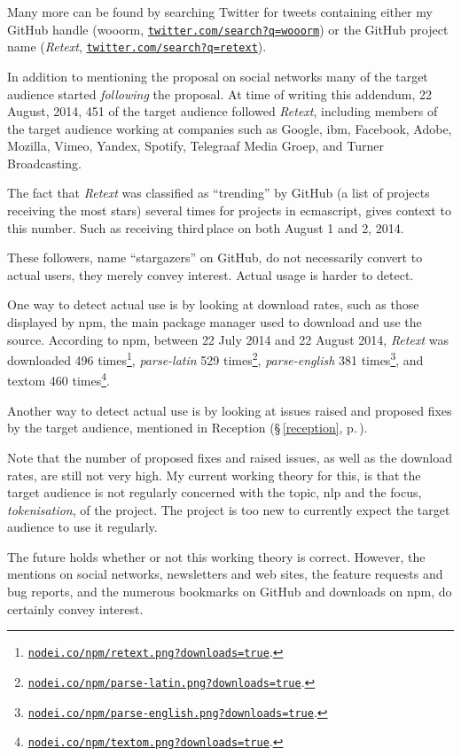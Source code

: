 \noindent Many more can be found by searching Twitter for tweets containing
  either my GitHub handle (wooorm,
  \href{https://twitter.com/search?f=realtime&q=wooorm}{\nolinkurl{twitter.com/search?q=wooorm}})
  or the GitHub project name (\emph{Retext},
  \href{https://twitter.com/search?f=realtime&q=retext}{\nolinkurl{twitter.com/search?q=retext}}).

In addition to mentioning the proposal on social networks many of the target
  audience started \emph{following} the proposal.
At time of writing this addendum, 22 August, 2014, 451 of the target
  audience followed \emph{Retext}, including members of the target audience
  working at companies such as Google, \gls{ibm}, Facebook, Adobe, Mozilla,
  Vimeo, Yandex, Spotify, Telegraaf Media Groep, and Turner Broadcasting.

The fact that \emph{Retext} was classified as ``trending'' by GitHub (a list
  of projects receiving the most stars) several times for projects in
  \gls{ecmascript}, gives context to this number.
Such as receiving third\,place on both August 1 and 2, 2014.

These followers, name ``stargazers'' on GitHub, do not necessarily convert to
  actual users, they merely convey interest.
Actual usage is harder to detect.

One way to detect actual use is by looking at download rates, such as
  those displayed by \gls{npm}, the main package manager used to download
  and use the source.
According to \gls{npm}, between 22 July 2014 and 22 August 2014, \emph{Retext}
  was downloaded 496 times\footnote{
    \href{https://nodei.co/npm/retext.png?downloads=true}{\nolinkurl{nodei.co/npm/retext.png?downloads=true}}.
  }, \emph{parse-latin} 529 times\footnote{
    \href{https://nodei.co/npm/parse-latin.png?downloads=true}{\nolinkurl{nodei.co/npm/parse-latin.png?downloads=true}}.
  }, \emph{parse-english} 381 times\footnote{
    \href{https://nodei.co/npm/parse-english.png?downloads=true}{\nolinkurl{nodei.co/npm/parse-english.png?downloads=true}}.
  },
  and \gls{textom} 460 times\footnote{
    \href{https://nodei.co/npm/textom.png?downloads=true}{\nolinkurl{nodei.co/npm/textom.png?downloads=true}}.
  }.

Another way to detect actual use is by looking at issues raised and proposed
  fixes by the target audience, mentioned in Reception (§\,\ref{reception},
  p.\,\pageref{reception}).

Note that the number of proposed fixes and raised issues, as well as the
  download rates, are still not very high.
My current working theory for this, is that the target audience is not
  regularly concerned with the topic, \gls{nlp} and the focus,
  \emph{tokenisation}, of the project.
The project is too new to currently expect the target audience to use it
  regularly.

The future holds whether or not this working theory is correct.
However, the mentions on social networks, newsletters and web sites,
  the feature requests and bug reports, and the numerous bookmarks on
  GitHub and downloads on \gls{npm}, do certainly convey interest.

\endgroup
